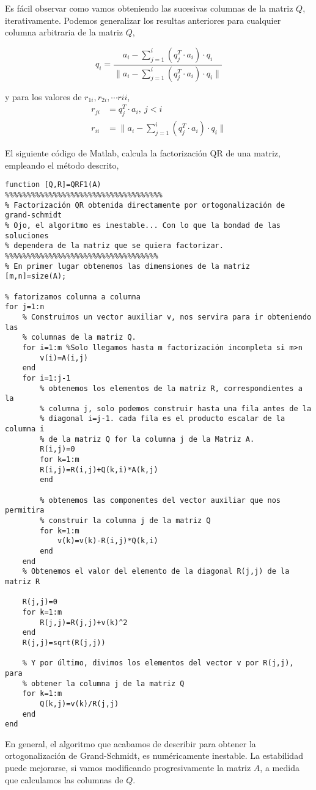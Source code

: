 Es fácil observar como vamos obteniendo las sucesivas columnas de la matriz $Q$, iterativamente. Podemos generalizar los resultas anteriores para cualquier columna arbitraria de la matriz $Q$,

\begin{equation*}
q_i=\frac{a_i-\sum_{j=1}^i (q_j^T\cdot a_i)\cdot q_i}{\lVert a_i-\sum_{j=1}^i (q_j^T\cdot a_i)\cdot q_i \rVert}
\end{equation*}

y para los valores de $r_{1i}, r_{2i}, \cdots r{ii}$,
\begin{align*}
r_{ji}&=q_j^T\cdot a_i, \ j<i\\
r_{ii}&= \lVert a_i-\sum_{j=1}^i (q_j^T\cdot a_i)\cdot q_i \rVert
\end{align*}

El siguiente código de Matlab, calcula la factorización QR de una matriz, empleando el método descrito,

\begin{lstlisting}
function [Q,R]=QRF1(A)
%%%%%%%%%%%%%%%%%%%%%%%%%%%%%%%%%%%%
% Factorización QR obtenida directamente por ortogonalización de grand-schmidt
% Ojo, el algoritmo es inestable... Con lo que la bondad de las soluciones
% dependera de la matriz que se quiera factorizar.
%%%%%%%%%%%%%%%%%%%%%%%%%%%%%%%%%%%
% En primer lugar obtenemos las dimensiones de la matriz
[m,n]=size(A);

% fatorizamos columna a columna
for j=1:n
    % Construimos un vector auxiliar v, nos servira para ir obteniendo las
    % columnas de la matriz Q.
    for i=1:m %Solo llegamos hasta m factorización incompleta si m>n
        v(i)=A(i,j)
    end
    for i=1:j-1
        % obtenemos los elementos de la matriz R, correspondientes a la
        % columna j, solo podemos construir hasta una fila antes de la
        % diagonal i=j-1. cada fila es el producto escalar de la columna i
        % de la matriz Q for la columna j de la Matriz A.
        R(i,j)=0
        for k=1:m
        R(i,j)=R(i,j)+Q(k,i)*A(k,j)
        end
        
        % obtenemos las componentes del vector auxiliar que nos permitira
        % construir la columna j de la matriz Q
        for k=1:m
            v(k)=v(k)-R(i,j)*Q(k,i)
        end
    end
    % Obtenemos el valor del elemento de la diagonal R(j,j) de la matriz R

    R(j,j)=0
    for k=1:m
        R(j,j)=R(j,j)+v(k)^2
    end
    R(j,j)=sqrt(R(j,j))
    
    % Y por último, divimos los elementos del vector v por R(j,j), para
    % obtener la columna j de la matriz Q
    for k=1:m
        Q(k,j)=v(k)/R(j,j)
    end
end
\end{lstlisting}
En general, el algoritmo que acabamos de describir para obtener la ortogonalización de Grand-Schmidt, es numéricamente inestable. La estabilidad puede mejorarse, si vamos modificando progresivamente la matriz $A$, a medida que calculamos las columnas de $Q$. 

